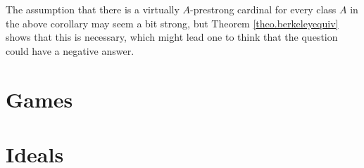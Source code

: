 \documentclass[../../main]{subfiles}
\begin{document}
The assumption that there is a virtually $A$-prestrong cardinal for every class $A$ in the above corollary may seem a bit strong, but Theorem \ref{theo.berkeleyequiv} shows that this is necessary, which might lead one to think that the question could have a negative answer. 



\section{Games}



\section{Ideals}

\end{document}
